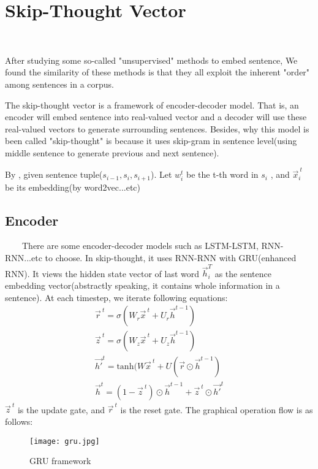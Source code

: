 \documentclass{article}
\begin{document}
\section{Skip-Thought Vector}
~~~~\par After studying some so-called "unsupervised" methods to embed sentence, We found the similarity of these methods is that they all exploit the inherent "order" among sentences in a corpus. 
	\newline

	\par The skip-thought vector is a framework of encoder-decoder model. That is, an encoder will embed sentence into real-valued vector and a decoder will use these real-valued vectors to generate surrounding sentences. Besides, why this model is been called "skip-thought" is because it uses skip-gram in sentence level(using middle sentence to generate previous and next sentence).
	\newline

	\par By \cite{kiros2015skip} , given sentence tuple($s_{i-1},s_i,s_{i+1}$). Let $w_{i}^{t}$ be the t-th word in $s_i$ , and $\vec{x}_{i}^{\ t}$ be its embedding(by word2vec...etc)

\subsection{Encoder}
\par~~~~There are some encoder-decoder models such as LSTM-LSTM, RNN-RNN...etc to choose. In skip-thought\cite{kiros2015skip}, it uses RNN-RNN with GRU\cite{chung2015gated}(enhanced RNN). It views the hidden state vector of last word $\vec{h}_{i}^{T}$ as the sentence embedding vector(abstractly speaking, it contains whole information in a sentence). At each timestep, we iterate following equations:
	\begin{align}
	\vec{r}^{\ t} = \sigma(W_r\vec{x}^{\ t} + U_r\vec{h}^{t-1}) \\
	\vec{z}^{\ t} = \sigma(W_z\vec{x}^{\ t} + U_z\vec{h}^{t-1}) \\
	\vec{h'}^t = \text{tanh}(W\vec{x}^{\ t} + U(\vec{r}\odot \vec{h}^{t-1}) \\
	\vec{h}^t = (1-\vec{z}^{\ t}) \odot \vec{h}^{t-1} + \vec{z}^{\ t} \odot \vec{h'}^t
	\end{align}
	$\vec{z}^{\ t}$ is the update gate, and $\vec{r}^{\ t}$ is the reset gate. The graphical operation flow is as follows:
	\begin{figure}[H]
	\begin{center}
		\texttt{[image: gru.jpg]}
		\caption{GRU framework\cite{grufig}}
	\end{center}
\end{figure}
\end{document}
